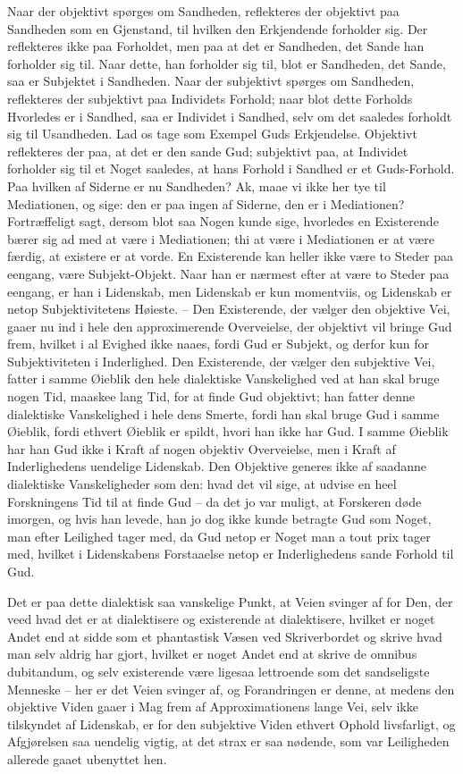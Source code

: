 \documentclass[12pt,a4paper]{article}
\begin{document}
Naar der objektivt spørges om Sandheden, reflekteres der objektivt paa Sandheden som en Gjenstand, til hvilken den Erkjendende forholder sig. Der reflekteres ikke paa Forholdet, men paa at det er Sandheden, det Sande han forholder sig til. Naar dette, han forholder sig til, blot er Sandheden, det Sande, saa er Subjektet i Sandheden. Naar der subjektivt spørges om Sandheden, reflekteres der subjektivt paa Individets Forhold; naar blot dette Forholds Hvorledes er i Sandhed, saa er Individet i Sandhed, selv om det saaledes forholdt sig til Usandheden. Lad os tage som Exempel Guds Erkjendelse. Objektivt reflekteres der paa, at det er den sande Gud; subjektivt paa, at Individet forholder sig til et Noget saaledes, at hans Forhold i Sandhed er et Guds-Forhold. Paa hvilken af Siderne er nu Sandheden? Ak, maae vi ikke her tye til Mediationen, og sige: den er paa ingen af Siderne, den er i Mediationen? Fortræffeligt sagt, dersom blot saa Nogen kunde sige, hvorledes en Existerende bærer sig ad med at være i Mediationen; thi at være i Mediationen er at være færdig, at existere er at vorde. En Existerende kan heller ikke være to Steder paa eengang, være Subjekt-Objekt. Naar han er nærmest efter at være to Steder paa eengang, er han i Lidenskab, men Lidenskab er kun momentviis, og Lidenskab er netop Subjektivitetens Høieste. – Den Existerende, der vælger den objektive Vei, gaaer nu ind i hele den approximerende Overveielse, der objektivt vil bringe Gud frem, hvilket i al Evighed ikke naaes, fordi Gud er Subjekt, og derfor kun for Subjektiviteten i Inderlighed. Den Existerende, der vælger den subjektive Vei, fatter i samme Øieblik den hele dialektiske Vanskelighed ved at han skal bruge nogen Tid, maaskee lang Tid, for at finde Gud objektivt; han fatter denne dialektiske Vanskelighed i hele dens Smerte, fordi han skal bruge Gud i samme Øieblik, fordi ethvert Øieblik er spildt, hvori han ikke har Gud. I samme Øieblik har han Gud ikke i Kraft af nogen objektiv Overveielse, men i Kraft af Inderlighedens uendelige Lidenskab. Den Objektive generes ikke af saadanne dialektiske Vanskeligheder som den: hvad det vil sige, at udvise en heel Forskningens Tid til at finde Gud – da det jo var muligt, at Forskeren døde imorgen, og hvis han levede, han jo dog ikke kunde betragte Gud som Noget, man efter Leilighed tager med, da Gud netop er Noget man a tout prix tager med, hvilket i Lidenskabens Forstaaelse netop er Inderlighedens sande Forhold til Gud.

Det er paa dette dialektisk saa vanskelige Punkt, at Veien svinger af for Den, der veed hvad det er at dialektisere og existerende at dialektisere, hvilket er noget Andet end at sidde som et phantastisk Væsen ved Skriverbordet og skrive hvad man selv aldrig har gjort, hvilket er noget Andet end at skrive de omnibus dubitandum, og selv existerende være ligesaa lettroende som det sandseligste Menneske – her er det Veien svinger af, og Forandringen er denne, at medens den objektive Viden gaaer i Mag frem af Approximationens lange Vei, selv ikke tilskyndet af Lidenskab, er for den subjektive Viden ethvert Ophold livsfarligt, og Afgjørelsen saa uendelig vigtig, at det strax er saa nødende, som var Leiligheden allerede gaaet ubenyttet hen.
\end{document}
